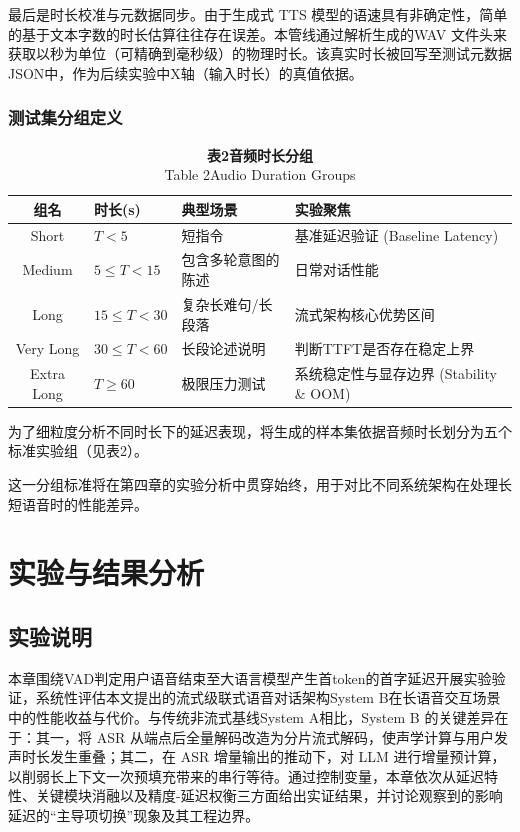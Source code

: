 \documentclass[UTF8,a4paper,zihao=5]{ctexart}
\begin{document}
最后是时长校准与元数据同步。由于生成式 TTS 模型的语速具有非确定性，简单的基于文本字数的时长估算往往存在误差。本管线通过解析生成的WAV 文件头来获取以秒为单位（可精确到毫秒级）的物理时长。该真实时长被回写至测试元数据JSON中，作为后续实验中X轴（输入时长）的真值依据。

\subsubsection{测试集分组定义}

\begin{table}[htbp]
\centering
\caption*{\textbf{表2\quad 音频时长分组}\\
Table 2\quad Audio Duration Groups}
\begin{tabular}{clll}
\toprule
组名 & 时长(s) & 典型场景 & 实验聚焦 \\
\midrule
Short & $T<5$ & 短指令 & 基准延迟验证 (Baseline Latency) \\
Medium & $5\leq T<15$ & 包含多轮意图的陈述 & 日常对话性能 \\
Long & $15\leq T<30$ & 复杂长难句/长段落 & 流式架构核心优势区间 \\
Very Long & $30\leq T<60$ & 长段论述说明 & 判断TTFT是否存在稳定上界 \\
Extra Long & $T\geq60$ & 极限压力测试 & 系统稳定性与显存边界 (Stability \& OOM) \\
\bottomrule
\end{tabular}
\end{table}

为了细粒度分析不同时长下的延迟表现，将生成的样本集依据音频时长划分为五个标准实验组（见表2）。

这一分组标准将在第四章的实验分析中贯穿始终，用于对比不同系统架构在处理长短语音时的性能差异。

\section{实验与结果分析}

\subsection{实验说明}

本章围绕VAD判定用户语音结束至大语言模型产生首token的首字延迟开展实验验证，系统性评估本文提出的流式级联式语音对话架构System B在长语音交互场景中的性能收益与代价。与传统非流式基线System A相比，System B 的关键差异在于：其一，将 ASR 从端点后全量解码改造为分片流式解码，使声学计算与用户发声时长发生重叠；其二，在 ASR 增量输出的推动下，对 LLM 进行增量预计算，以削弱长上下文一次预填充带来的串行等待。通过控制变量，本章依次从延迟特性、关键模块消融以及精度-延迟权衡三方面给出实证结果，并讨论观察到的影响延迟的“主导项切换”现象及其工程边界。
\end{document}

